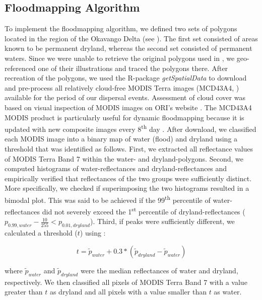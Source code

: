 \documentclass[abstract=on,10pt,a4paper,bibliography=totocnumbered]{scrartcl}
\begin{document}
\subsection{Floodmapping Algorithm}
\label{Appendix:FloodmappingAlgorithm}
To implement the floodmapping algorithm, we defined two sets of polygons located
in the region of the Okavango Delta (see ). The first set
consisted of areas known to be permanent dryland, whereas the second set
consisted of permanent waters. Since we were unable to retrieve the original
polygons used in \cite{Wolski.2017}, we geo-referenced one of their
illustrations and traced the polygons there. After recreation of the polygons,
we used the R-package \textit{getSpatialData} \citep{Schwalb.2018} to download
and pre-process all relatively cloud-free MODIS Terra images (MCD43A4,
\citealp{Schaaf.2015}) available for the period of our dispersal events.
Assessment of cloud cover was based on visual inspection of MODIS images on
ORI's website \citep{ORI.2019}. The MCD43A4 MODIS product is particularly useful
for dynamic floodmapping because it is updated with new composite images every
8\textsuperscript{th} day \citep{Wolski.2017}. After download, we classified
each MODIS image into a binary map of water (flood) and dryland using a
threshold that was identified as follows. First, we extracted all reflectance
values of MODIS Terra Band 7 within the water- and dryland-polygons. Second, we
computed histograms of water-reflectances and dryland-reflectances and
empirically verified that reflectances of the two groups were sufficiently
distinct. More specifically, we checked if superimposing the two histograms
resulted in a bimodal plot. This was said to be achieved if the
99\textsuperscript{th} percentile of water-reflectances did not severely exceed
the 1\textsuperscript{st} percentile of dryland-reflectances (\(p_{0.99, water}
- \frac{10}{255} < p_{0.01, dryland}\)). Third, if peaks were sufficiently
different, we calculated a threshold (\(t\)) using :

\begin{equation}
\label{EQ1}
t = \widetilde{p}_{water} + 0.3 * (\widetilde{p}_{dryland} -
\widetilde{p}_{water})
\end{equation}

\noindent where \(\widetilde{p}_{water}\) and \(\widetilde{p}_{dryland}\) were
the median reflectances of water and dryland, respectively. We then classified
all pixels of MODIS Terra Band 7 with a value greater than \(t\) as dryland and
all pixels with a value smaller than \(t\) as water.
\end{document}
